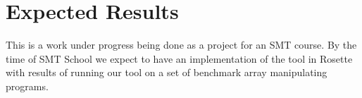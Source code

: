 \documentclass[letterpaper]{article} %
\begin{document}
\section{Expected Results}
This is a work under progress being done as a project for an SMT course.
By the time of SMT School we expect to have an implementation of the tool in Rosette with results of running our tool on a set of benchmark array manipulating programs.



\end{document}
